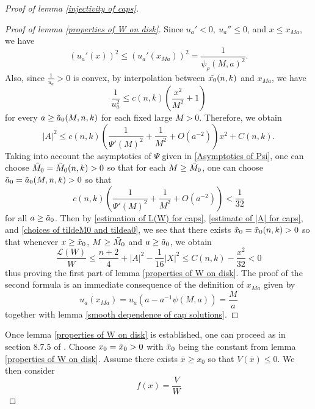 \documentclass[pdflatex,sn-mathphys-num]{sn-jnl}
\begin{document}
\begin{proof}[Proof of lemma \ref{injectivity of caps}]
\begin{proof}[Proof of lemma \ref{properties of W on disk}]
Since $u_a' < 0, \ u_a'' \leq 0$, and $x \leq x_{Ma}$, we have
\begin{equation}
    (u_a'(x))^2 \leq (u_a'(x_{Ma}))^2 = \frac{1}{\psi_{\rho}(M, a)^2}.
\end{equation}
Also, since $\frac{1}{u_a} > 0$ is convex, by interpolation between $\Tilde{x_0}(n,k)$ and $x_{Ma}$, we have
\begin{equation}
    \frac{1}{u_a^2} \leq c(n,k)(\frac{x^2}{M^2} + 1) 
\end{equation}
for every $a \geq \Tilde{a}_0(M,n,k)$ for each fixed large $M > 0$. Therefore, we obtain
\begin{equation}\label{estimate of |A| for caps}
    |A|^2 \leq c(n,k)(\frac{1}{\Psi'(M)^2} + \frac{1}{M^2} + O(a^{-2}))x^2 + C(n,k).
\end{equation}
Taking into account the asymptotics of $\Psi$ given in \eqref{Asymptotics of Psi}, one can choose $\Tilde{M}_0 = \Tilde{M}_0(n,k) > 0$ so that for each $M \geq \Tilde{M}_0$, one can choose $\Tilde{a}_0 = \Tilde{a}_0(M, n, k) > 0$ so that 
\begin{equation}\label{choices of tildeM0 and tildea0}
    c(n,k)(\frac{1}{\Psi'(M)^2} + \frac{1}{M^2} + O(a^{-2})) < \frac{1}{32}
\end{equation}
for all $a \geq \Tilde{a}_0$. Then by \eqref{estimation of L(W) for caps}, \eqref{estimate of |A| for caps}, and \eqref{choices of tildeM0 and tildea0}, we see that there exists $\Tilde{x}_0 = \Tilde{x}_0(n,k) > 0$ so that whenever $x \geq \Tilde{x}_0$, $M \geq \Tilde{M}_0$ and $a \geq \Tilde{a}_0$, we obtain
\begin{equation}\label{LW is supersolution}
    \frac{\mathcal{L}(W)}{W} \leq \frac{n + 2}{4} + |A|^2 - \frac{1}{16}|X|^2  \leq C(n,k) - \frac{x^2}{32} < 0
\end{equation}
thus proving the first part of lemma \ref{properties of W on disk}. The proof of the second formula is an immediate consequence of the definition of $x_{Ma}$ given by
\begin{equation}
    u_a(x_{Ma}) = u_a(a - a^{-1}\psi(M, a)) = \frac{M}{a}
\end{equation}
together with lemma \ref{smooth dependence of cap solutions}.
\end{proof}
Once lemma \ref{properties of W on disk} is established, one can proceed as in section 8.7.5 of \cite{ADS}. Choose $x_0 = \Tilde{x}_0 > 0$ with $\Tilde{x}_0$ being the constant from lemma \ref{properties of W on disk}. Assume there exists $\overline{x} \geq x_0$ so that $V(\overline{x}) \leq 0$. We then consider $$f(x) = \frac{V}{W}$$

\end{proof}
\end{document}

